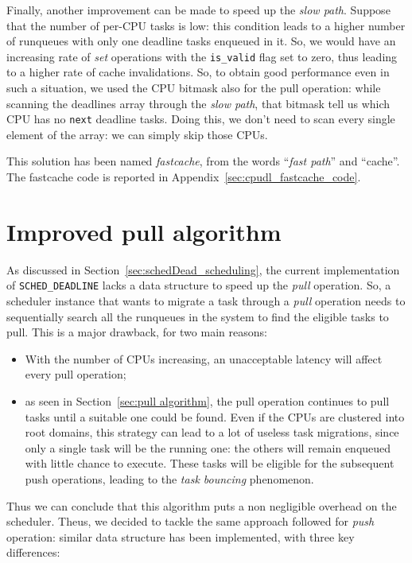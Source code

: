 Finally, another improvement can be made to speed up the \emph{slow path}. Suppose that
the number of per-CPU tasks is low: this condition leads to a higher number
of runqueues with only one deadline tasks enqueued in it. So, we would have an
increasing rate of \emph{set} operations with the \texttt{is\_valid} flag set to zero, 
thus leading to a higher rate of cache invalidations. So, to obtain good performance even
in such a situation, we used the CPU bitmask also for the pull operation: while scanning
the deadlines array through the \emph{slow path}, that bitmask tell us which CPU
has no \texttt{next} deadline tasks. Doing this, we don't need to scan every single
element of the array: we can simply skip those CPUs.

This solution has been named \emph{fastcache}, from the words ``\emph{fast path}'' and
``cache''.
The fastcache code is reported in Appendix~\ref{sec:cpudl_fastcache_code}.

\section{Improved pull algorithm\label{sec:pull_algo}}

As discussed in Section~\ref{sec:schedDead_scheduling}, the current implementation
of \texttt{SCHED\_DEADLINE} lacks a data structure to speed up the \emph{pull}
operation. So, a scheduler instance that wants to migrate a task through a
\emph{pull} operation needs to sequentially search all the runqueues in 
the system to find the eligible tasks to pull. This is a major drawback, 
for two main reasons:

\begin{itemize}
\item With the number of CPUs increasing, an unacceptable
latency will affect every pull operation;
\item as seen in Section~\ref{sec:pull algorithm}, the pull operation continues to pull
tasks until a suitable one could be found. Even if the CPUs are clustered
into root domains, this strategy can lead to a lot of useless task migrations,
since only a single task will be the running one: the others will
remain enqueued with little chance to execute. These tasks will be eligible 
for the subsequent push operations, leading to the \emph{task bouncing} phenomenon.
\end{itemize}

Thus we can conclude that this algorithm puts a non negligible overhead
on the scheduler.
Theus, we decided to tackle the same approach followed for \emph{push}
operation: similar data structure has been implemented, with three key differences:

